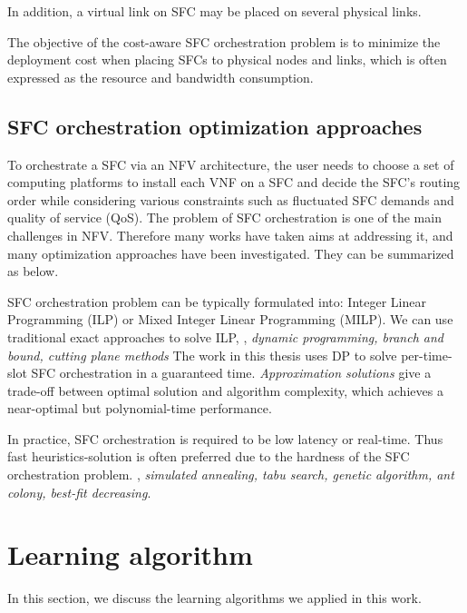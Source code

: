 \noindent In addition, a virtual link on SFC may be placed on several physical links.

 The objective of the cost-aware SFC orchestration problem is to minimize the deployment cost when placing SFCs to physical nodes and links, which is often expressed as the resource and bandwidth consumption.








\subsection{SFC orchestration optimization approaches}
To orchestrate a SFC via an NFV architecture, the user needs to choose a set of computing platforms to install each VNF on a SFC and decide the SFC's routing order while considering various constraints such as fluctuated SFC demands and quality of service (QoS). The problem of SFC orchestration is one of the main challenges in NFV. Therefore many works have taken aims at addressing it, and many optimization approaches have been investigated. They can be summarized as below.

 SFC orchestration problem can be typically formulated into: Integer Linear Programming (ILP) or Mixed Integer Linear Programming (MILP). We can use traditional exact approaches to solve ILP, \eg, \textit{dynamic programming, branch and bound, cutting plane methods}
The work in this thesis uses DP to solve per-time-slot SFC orchestration in a guaranteed time. \textit{Approximation solutions} give a trade-off between optimal solution and algorithm complexity, which achieves a near-optimal but polynomial-time performance.

In practice, SFC orchestration is required to be low latency or real-time. Thus fast heuristics-solution is often preferred due to the hardness of the SFC orchestration problem. \eg, \textit{simulated annealing, tabu search, genetic algorithm, ant colony, best-fit decreasing}. 


\section{Learning algorithm}
In this section, we discuss the learning algorithms we applied in this work.
\label{sec:online learning}
